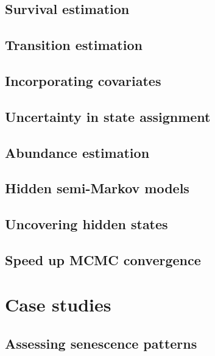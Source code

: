 \documentclass[
  12pt,
]{krantz}
\begin{document}
\hypertarget{survival}{%
\chapter{Survival estimation}\label{survival}}

\hypertarget{transition}{%
\chapter{Transition estimation}\label{transition}}

\hypertarget{covariates}{%
\chapter{Incorporating covariates}\label{covariates}}

\hypertarget{uncertainty}{%
\chapter{Uncertainty in state assignment}\label{uncertainty}}

\hypertarget{abundance}{%
\chapter{Abundance estimation}\label{abundance}}

\hypertarget{hsmm}{%
\chapter{Hidden semi-Markov models}\label{hsmm}}

\hypertarget{states}{%
\chapter{Uncovering hidden states}\label{states}}

\hypertarget{speed}{%
\chapter{Speed up MCMC convergence}\label{speed}}

\hypertarget{part-case-studies}{%
\part{Case studies}\label{part-case-studies}}

\hypertarget{senescence}{%
\chapter{Assessing senescence patterns}\label{senescence}}
\end{document}
